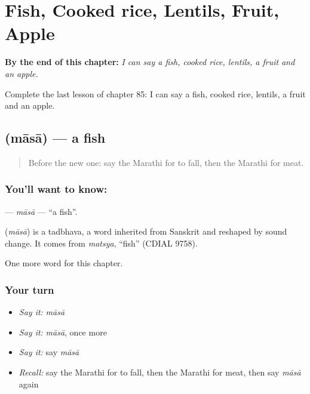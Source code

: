 
\chapter{Fish, Cooked rice, Lentils, Fruit, Apple}
\label{ch:mr-fish-cooked-rice-lentils-fruit-apple}

\begin{chapteropening}
\textbf{By the end of this chapter:} \emph{I can say a fish, cooked rice, lentils, a fruit and an apple.}

Complete the last lesson of chapter 85: I can say a fish, cooked rice, lentils, a fruit and an apple.
\end{chapteropening}

\section[\texorpdfstring{\mr{मासा} (māsā)}{मासा (māsā)}]{ (māsā) — a fish}

\label{lesson:MR-C85-masa}



\begin{quote}
Before the new one: say the Marathi for to fall, then the Marathi for meat.
\end{quote}

\subsection*{You'll want to know: }
\textbf{} — \emph{māsā} — \textquotedblleft{}a fish\textquotedblright{}.

\begin{cousinweb}
\textbf{} (\emph{māsā}) is a tadbhava, a word inherited from Sanskrit and reshaped by sound change. It comes from \emph{matsya}, \textquotedblleft{}fish\textquotedblright{} (CDIAL 9758).
\end{cousinweb}

\begin{grammarlens}[title={What you've built}]
One more word for this chapter.
\end{grammarlens}

\subsection*{Your turn}
\begin{itemize}
\raggedright
  \item \emph{Say it:} \emph{māsā}
  \item \emph{Say it:} \emph{māsā}, once more
  \item \emph{Say it:} say \emph{māsā}
  \item \emph{Recall:} say the Marathi for to fall, then the Marathi for meat, then say \emph{māsā} again
\end{itemize}

